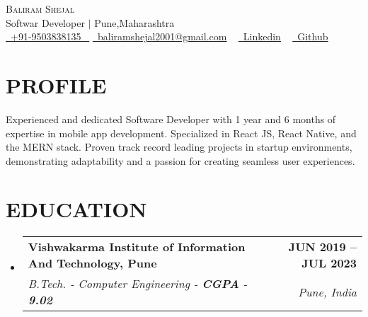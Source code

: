 \documentclass[letterpaper,11pt]{article}
\makeatletter
\newcommand{\resumeSubheading}[4]{
  \vspace{-2pt}\item
    \begin{tabular*}{1.0\textwidth}[t]{l@{\extracolsep{\fill}}r}
      \textbf{\large#1} & \textbf{\small #2} \\
      \textit{\large#3} & \textit{\small #4} \\
      
    \end{tabular*}\vspace{-7pt}
}
\newcommand{\resumeSubHeadingListStart}{\begin{itemize}[leftmargin=0.0in, label={}]}
\newcommand{\resumeSubHeadingListEnd}{\end{itemize}}
\makeatother
\begin{document}


\begin{center}
    {\Huge \scshape Baliram Shejal} \\ \vspace{1pt}
   Softwar Developer $|$ Pune,Maharashtra \\ \vspace{1pt}
    \small \href{tel:+919503838135}{ \raisebox{-0.1\height}\faPhone\ \underline{+91-9503838135} ~} \href{mailto:baliramshejal2001@gmail.com}{\raisebox{-0.2\height}\faEnvelope\  \underline{baliramshejal2001@gmail.com}} ~ 
    \href{https://linkedin.com/in/balram01}{\raisebox{-0.2\height}\faLinkedinSquare\ \underline{Linkedin}}  ~
    \href{https://github.com/balram-01}{\raisebox{-0.2\height}\faGithub\ \underline{Github}} ~
    
    \vspace{-8pt}
\end{center}


\section{PROFILE}
Experienced and dedicated Software Developer with 1 year and 6 months of expertise in mobile app development. Specialized in React JS, React Native, and the MERN stack. Proven track record leading projects in startup environments, demonstrating adaptability and a passion for creating seamless user experiences.

\section{EDUCATION}
  \resumeSubHeadingListStart
    \resumeSubheading
      {Vishwakarma Institute of Information And Technology, Pune }{JUN 2019 -- JUL 2023}
      {B.Tech. - Computer Engineering  - \textbf{CGPA} - \textbf{9.02}}{Pune, India}
  \resumeSubHeadingListEnd
  
\end{document}
